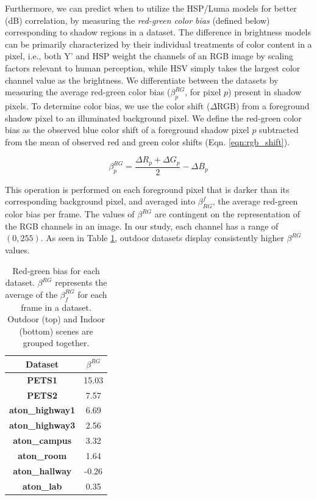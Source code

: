 Furthermore, we can predict when to utilize the HSP/Luma models for better (dB) correlation, by measuring the \textit{red-green color bias} (defined below) corresponding to shadow regions in a dataset. The difference in brightness models can be primarily characterized by their individual treatments of color content in a pixel, i.e., both Y' and HSP weight the channels of an RGB image by scaling factors relevant to human perception, while HSV simply takes the largest color channel value as the brightness. We differentiate between the datasets by measuring the average red-green color bias ($\beta^{RG}_{p}$, for pixel $p$) present in shadow pixels. To determine color bias, we use the color shift ($\Delta$RGB) from a foreground shadow pixel to an illuminated background pixel. We define the red-green color bias as the observed blue color shift of a foreground shadow pixel $p$ subtracted from the mean of observed red and green color shifts (Eqn. \ref{eqn:rgb_shift}).

\begin{equation}
\beta^{RG}_{p} = \dfrac{\Delta R_{p} + \Delta G_{p}}{2} - \Delta B_{p}
\label{eqn:rgb_shift}
\end{equation}

This operation is performed on each foreground pixel that is darker than its corresponding background pixel, and averaged into $\beta^{f}_{RG}$, the average red-green color bias per frame. The values of $\beta^{RG}$ are contingent on the representation of the RGB channels in an image. In our study, each channel has a range of $(0, 255)$. As seen in Table \ref{table:rg_bias}, outdoor datasets display consistently higher $\beta^{RG}$ values.

\begin{table}
\centering
\begin{tabular}{ |c|c| }
	\hline
	\textbf{Dataset} & \textbf{$\beta^{RG}$} \\
	\hline
	\hline
	\textbf{PETS1} & 15.03 \\
	\hline
	\textbf{PETS2} & 7.57 \\
	\hline
	\textbf{aton\_highway1} & 6.69 \\
	\hline
	\textbf{aton\_highway3} & 2.56 \\
	\hline
	\textbf{aton\_campus} & 3.32 \\
	\hline
	\hline
	\textbf{aton\_room} & 1.64 \\
	\hline
	\textbf{aton\_hallway} & -0.26 \\
	\hline
	\textbf{aton\_lab} & 0.35 \\
	\hline
\end{tabular}
\caption{Red-green bias for each dataset. $\beta^{RG}$ represents the average of the $\beta^{RG}_{f}$ for each frame in a dataset. Outdoor (top) and Indoor (bottom) scenes are grouped together.}
\label{table:rg_bias}
\end{table}

